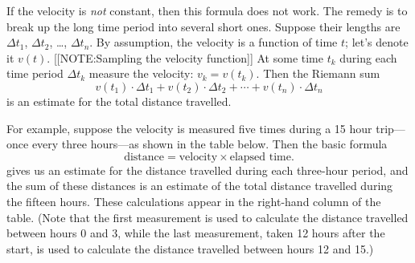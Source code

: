 	If the velocity is {\em not\/} constant, then this formula does not work.  The remedy is to break up the long time period into several short ones.  Suppose their lengths are $\Delta t_1$, $\Delta t_2$, \ldots, $\Delta t_n$.  By assumption, the velocity is a function of time $t$; let's denote it $v(t)$.  
	[[NOTE:Sampling the  velocity function]]
At some time $t_k$ during each time period $\Delta t_k$ measure the velocity: $v_k = v(t_k)$.  Then the Riemann sum
	\[
v(t_1) \cdot \Delta t_1 + v(t_2) \cdot \Delta t_2 + 
		 \cdots + v(t_n) \cdot \Delta t_n
\]
is an estimate for the total distance travelled.

	For example, suppose the velocity is measured five times during a 15 hour trip---once every three hours---as shown in the table below.  Then the basic formula 	\[
\mbox{distance} = \mbox{velocity} \times 
		\mbox{elapsed time}.
\]
gives us an estimate for the distance travelled during each three-hour period, and the sum of these distances is an estimate of the total distance travelled during the fifteen hours.  These calculations appear in the right-hand column of the table.  (Note that the first measurement is used to calculate the distance travelled between hours 0 and 3, while the last measurement, taken 12 hours after the start, is used to calculate the distance travelled between hours 12 and 15.)\label{ship}  
